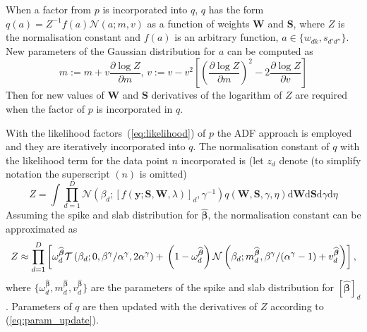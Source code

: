 \documentclass{article}
\begin{document}
  When a factor from $p$ is incorporated into $q$, $q$ has the form $q(a) = Z^{-1}f(a)\mathcal{N}(a; m, v)$ as a function of weights $\mathbf{W}$ and $\mathbf{S}$,
  where $Z$ is the normalisation constant and $f(a)$ is an arbitrary function, $a \in \{w_{dk}, s_{d'd''}\}$. New parameters of the Gaussian distribution for $a$ can be computed as~\cite{minka2001thesis}
  \begin{equation}
  \label{eq:param_update}
  m:= m + v \frac{\partial \log Z}{\partial m}, \,
  v:= v - v^2\left[ \left(\frac{\partial \log Z}{\partial m}\right)^2 - 2 \frac{\partial \log Z}{\partial v}\right]
  \end{equation}
Then for new values of $\mathbf{W}$ and $\mathbf{S}$ derivatives of the logarithm of $Z$ are required when the factor of $p$ is incorporated in $q$.
  
  With the likelihood factors~(\ref{eq:likelihood}) of $p$ the ADF approach is employed and they are iteratively incorporated into $q$. The normalisation constant of $q$ with the likelihood term for the data point $n$ incorporated is (let $z_d$ denote (to simplify notation the superscript $(n)$ is omitted)
  \begin{equation}
  Z  = \int \prod_{d=1}^{D} \mathcal{N}(\beta_d ; [f(\mathbf{y} ; \mathbf{S}, \mathbf{W}, \lambda)]_d, \gamma^{-1}) q(\mathbf{W}, \mathbf{S}, \gamma, \eta) \mathrm{d}\mathbf{W} \mathrm{d}\mathbf{S} \mathrm{d}\gamma \mathrm{d}\eta
  \end{equation}
  Assuming the spike and slab distribution for $\widehat{\boldsymbol\beta}$, the normalisation constant can be approximated as
\begin{equation}
\label{eq:Z}
Z \approx \prod_{d=1}^D \left[\omega^{\widehat{\boldsymbol\beta}}_d  \mathcal{T}\left(\beta_d ; 0, \beta^\gamma / \alpha^\gamma, 2\alpha^\gamma\right) + \vphantom{m^{\widehat{\boldsymbol\beta}}_d} \left(1 - \omega^{\widehat{\boldsymbol\beta}}_d\right)\mathcal{N}\left(\beta_d ; m^{\widehat{\boldsymbol\beta}}_d,  \beta^\gamma / (\alpha^\gamma - 1) + v^{\widehat{\boldsymbol\beta}}_d\right)\right],
\end{equation}
  where $\{\omega^{\widehat{\boldsymbol\beta}}_d, m^{\widehat{\boldsymbol\beta}}_d, v^{\widehat{\boldsymbol\beta}}_d\}$ are the parameters of the spike and slab distribution for $[\widehat{\boldsymbol\beta}]_d$. Parameters of $q$ are then updated with the derivatives of $Z$ according to (\ref{eq:param_update}).
  
\end{document}
